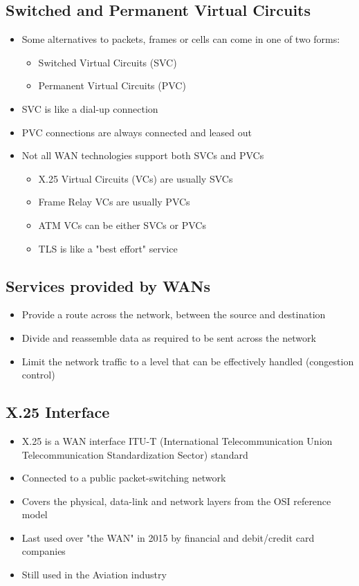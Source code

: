 \subsection*{Switched and Permanent Virtual Circuits}

\begin{itemize}
  \item Some alternatives to packets, frames or cells can come in one of two forms:
  \begin{itemize}
    \item Switched Virtual Circuits (SVC)
    \item Permanent Virtual Circuits (PVC)
  \end{itemize}
  \item SVC is like a dial-up connection
  \item PVC connections are always connected and leased out
  \item Not all WAN technologies support both SVCs and PVCs
  \begin{itemize}
    \item X.25 Virtual Circuits (VCs) are usually SVCs
    \item Frame Relay VCs are usually PVCs
    \item ATM VCs can be either SVCs or PVCs
    \item TLS is like a "best effort" service
  \end{itemize}
\end{itemize}

\subsection*{Services provided by WANs}

\begin{itemize}
  \item Provide a route across the network, between the source and destination
  \item Divide and reassemble data as required to be sent across the network
  \item Limit the network traffic to a level that can be effectively handled (congestion control)
\end{itemize}

\subsection*{X.25 Interface}

\begin{itemize}
  \item X.25 is a WAN interface ITU-T (International Telecommunication Union Telecommunication Standardization Sector) standard
  \item Connected to a public packet-switching network
  \item Covers the physical, data-link and network layers from the OSI reference model
  \item Last used over "the WAN" in 2015 by financial and debit/credit card companies
  \item Still used in the Aviation industry
\end{itemize}

